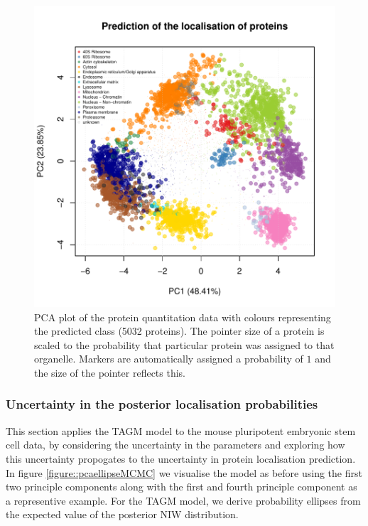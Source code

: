 \documentclass[12pt,english]{article}
\begin{document}
\begin{figure}[ht]
\includegraphics{tagm-005}

  \centering
  \caption{PCA plot of the protein quantitation data with colours representing
    the predicted class (5032 proteins). The pointer size of a protein is scaled to
    the probability that particular protein was assigned to that organelle. Markers
are automatically assigned a probability of $1$ and the size of the pointer reflects this.}
  \label{fig:assignmentPCAMAP}
\end{figure}


\clearpage

\subsubsection{Uncertainty in the posterior localisation probabilities}
This section applies the TAGM model to the mouse pluripotent embryonic stem cell data,
by considering the uncertainty in the parameters and exploring how this uncertainty propogates
to the uncertainty in protein localisation prediction.
In figure \ref{figure::pcaellipseMCMC} we visualise the model as before using the first two principle components along with the first and fourth
principle component as a representive example.
For the TAGM model, we derive probability ellipses from the expected value
of the posterior NIW distribution.
\end{document}
